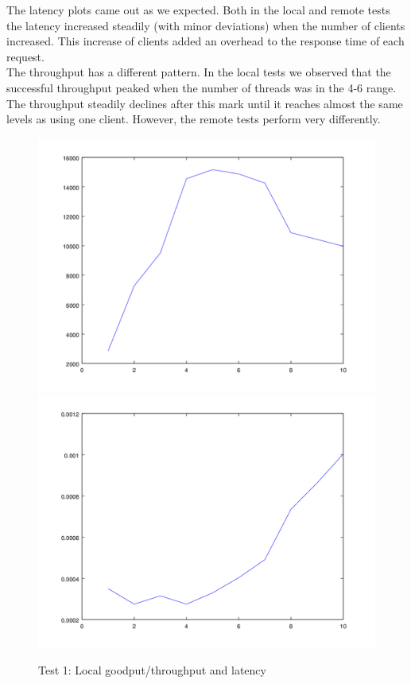 \documentclass{article}      %
\begin{document}
The latency plots came out as we expected. Both in the local and remote tests the latency increased steadily (with minor deviations) when the number of clients increased. This increase of clients added an overhead to the response time of each request.\\

The throughput has a different pattern. In the local tests we observed that the successful throughput peaked when the number of threads was in the 4-6 range. The throughput steadily declines after this mark until it reaches almost the same levels as using one client. However, the remote tests perform very differently.\\

\begin{figure}[ht]
\centering
 \includegraphics[scale=.33]{graphs/graph1-goodput}
 \includegraphics[scale=.33]{graphs/graph1-latency}
\caption{Test 1: Local goodput/throughput and latency \label{overflow}}
\end{figure}
\end{document}
